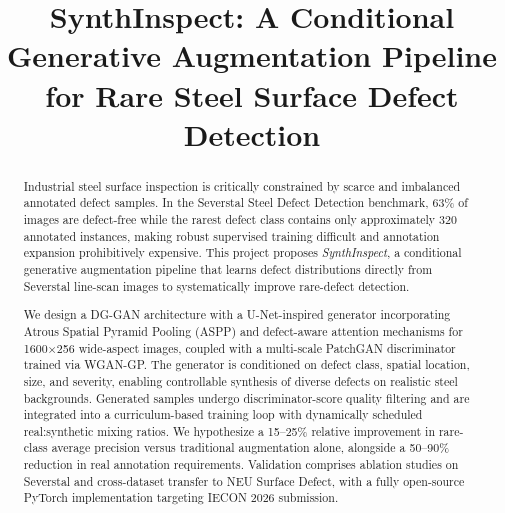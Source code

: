 \documentclass[conference]{IEEEtran}
\begin{document}
\title{SynthInspect: A Conditional Generative Augmentation Pipeline\\
for Rare Steel Surface Defect Detection\\}


\author{
\and
{}
}



\maketitle

\begin{abstract}
Industrial steel surface inspection is critically constrained by scarce
and imbalanced annotated defect samples. In the Severstal Steel Defect
Detection benchmark, 63\% of images are defect-free while the rarest
defect class contains only approximately 320 annotated instances,
making robust supervised training difficult and annotation expansion
prohibitively expensive. This project proposes \textit{SynthInspect},
a conditional generative augmentation pipeline that learns defect
distributions directly from Severstal line-scan images to
systematically improve rare-defect detection.

We design a DG-GAN architecture with a U-Net-inspired generator
incorporating Atrous Spatial Pyramid Pooling (ASPP) and defect-aware
attention mechanisms for 1600$\times$256 wide-aspect images, coupled
with a multi-scale PatchGAN discriminator trained via WGAN-GP. The
generator is conditioned on defect class, spatial location, size, and
severity, enabling controllable synthesis of diverse defects on
realistic steel backgrounds. Generated samples undergo
discriminator-score quality filtering and are integrated into a
curriculum-based training loop with dynamically scheduled real:synthetic
mixing ratios. We hypothesize a 15--25\% relative improvement in
rare-class average precision versus traditional augmentation alone,
alongside a 50--90\% reduction in real annotation requirements.
Validation comprises ablation studies on Severstal and cross-dataset
transfer to NEU Surface Defect, with a fully open-source PyTorch
implementation targeting IECON 2026 submission.
\end{abstract}
\end{document}
